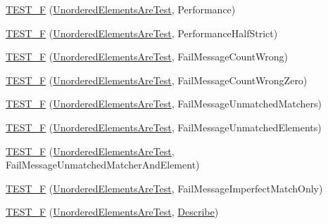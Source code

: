 \begin{DoxyCompactItemize}
\item 
\hyperlink{namespacetesting_1_1gmock__matchers__test_a074ca2babea203d1a54d69ff1fde5c59}{T\+E\+S\+T\+\_\+F} (\hyperlink{classtesting_1_1gmock__matchers__test_1_1_unordered_elements_are_test}{Unordered\+Elements\+Are\+Test}, Performance)
\item 
\hyperlink{namespacetesting_1_1gmock__matchers__test_a4437de9d40efd87f73b738ef38c2d70f}{T\+E\+S\+T\+\_\+F} (\hyperlink{classtesting_1_1gmock__matchers__test_1_1_unordered_elements_are_test}{Unordered\+Elements\+Are\+Test}, Performance\+Half\+Strict)
\item 
\hyperlink{namespacetesting_1_1gmock__matchers__test_a5dd3b28b540c1ef01e623f840c48e7b4}{T\+E\+S\+T\+\_\+F} (\hyperlink{classtesting_1_1gmock__matchers__test_1_1_unordered_elements_are_test}{Unordered\+Elements\+Are\+Test}, Fail\+Message\+Count\+Wrong)
\item 
\hyperlink{namespacetesting_1_1gmock__matchers__test_a7dc8c467fe0d6f26c0ee643be56eb590}{T\+E\+S\+T\+\_\+F} (\hyperlink{classtesting_1_1gmock__matchers__test_1_1_unordered_elements_are_test}{Unordered\+Elements\+Are\+Test}, Fail\+Message\+Count\+Wrong\+Zero)
\item 
\hyperlink{namespacetesting_1_1gmock__matchers__test_a11b785087491ae58b074fa8dbbc88cd4}{T\+E\+S\+T\+\_\+F} (\hyperlink{classtesting_1_1gmock__matchers__test_1_1_unordered_elements_are_test}{Unordered\+Elements\+Are\+Test}, Fail\+Message\+Unmatched\+Matchers)
\item 
\hyperlink{namespacetesting_1_1gmock__matchers__test_a6dfb50dcbb543de71fcc4d09844d36b3}{T\+E\+S\+T\+\_\+F} (\hyperlink{classtesting_1_1gmock__matchers__test_1_1_unordered_elements_are_test}{Unordered\+Elements\+Are\+Test}, Fail\+Message\+Unmatched\+Elements)
\item 
\hyperlink{namespacetesting_1_1gmock__matchers__test_a2395b7e71b7ad50af72caa61c10e6898}{T\+E\+S\+T\+\_\+F} (\hyperlink{classtesting_1_1gmock__matchers__test_1_1_unordered_elements_are_test}{Unordered\+Elements\+Are\+Test}, Fail\+Message\+Unmatched\+Matcher\+And\+Element)
\item 
\hyperlink{namespacetesting_1_1gmock__matchers__test_ac70f9f9717f35352349b076654094f6a}{T\+E\+S\+T\+\_\+F} (\hyperlink{classtesting_1_1gmock__matchers__test_1_1_unordered_elements_are_test}{Unordered\+Elements\+Are\+Test}, Fail\+Message\+Imperfect\+Match\+Only)
\item 
\hyperlink{namespacetesting_1_1gmock__matchers__test_a937f4d835023cd6322eb7d32596f3f43}{T\+E\+S\+T\+\_\+F} (\hyperlink{classtesting_1_1gmock__matchers__test_1_1_unordered_elements_are_test}{Unordered\+Elements\+Are\+Test}, \hyperlink{namespacetesting_1_1gmock__matchers__test_a36ae44e4f6c8e9fe3fe9162132503717}{Describe})

\end{DoxyCompactItemize}
